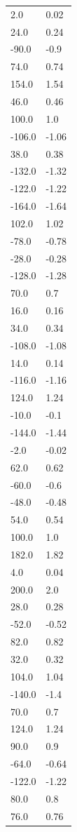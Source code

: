 \begin{longtable}{ll}
2.0 & 0.02 \\
24.0 & 0.24 \\
-90.0 & -0.9 \\
74.0 & 0.74 \\
154.0 & 1.54 \\
46.0 & 0.46 \\
100.0 & 1.0 \\
-106.0 & -1.06 \\
38.0 & 0.38 \\
-132.0 & -1.32 \\
-122.0 & -1.22 \\
-164.0 & -1.64 \\
102.0 & 1.02 \\
-78.0 & -0.78 \\
-28.0 & -0.28 \\
-128.0 & -1.28 \\
70.0 & 0.7 \\
16.0 & 0.16 \\
34.0 & 0.34 \\
-108.0 & -1.08 \\
14.0 & 0.14 \\
-116.0 & -1.16 \\
124.0 & 1.24 \\
-10.0 & -0.1 \\
-144.0 & -1.44 \\
-2.0 & -0.02 \\
62.0 & 0.62 \\
-60.0 & -0.6 \\
-48.0 & -0.48 \\
54.0 & 0.54 \\
100.0 & 1.0 \\
182.0 & 1.82 \\
4.0 & 0.04 \\
200.0 & 2.0 \\
28.0 & 0.28 \\
-52.0 & -0.52 \\
82.0 & 0.82 \\
32.0 & 0.32 \\
104.0 & 1.04 \\
-140.0 & -1.4 \\
70.0 & 0.7 \\
124.0 & 1.24 \\
90.0 & 0.9 \\
-64.0 & -0.64 \\
-122.0 & -1.22 \\
80.0 & 0.8 \\
76.0 & 0.76 \\

\end{longtable}
